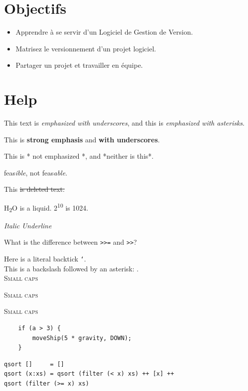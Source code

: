 \hypertarget{objectifs}{%
\section{Objectifs}\label{objectifs}}

\begin{itemize}
\tightlist
\item
  Apprendre à se servir d'un Logiciel de Gestion de Version.
\item
  Matrisez le versionnement d'un projet logiciel.
\item
  Partager un projet et travailler en équipe.
\end{itemize}

\hypertarget{help}{%
\section{Help}\label{help}}

This text is \emph{emphasized with underscores}, and this is
\emph{emphasized with asterisks}.

This is \textbf{strong emphasis} and \textbf{with underscores}.

This is * not emphasized *, and *neither is this*.

feas\emph{ible}, not feas\emph{able}.

This \sout{is deleted text.}

H\textsubscript{2}O is a liquid. 2\textsuperscript{10} is 1024.

\emph{Italic} \ULforem \emph{Underline} \normalem

What is the difference between \texttt{>>=} and
\texttt{>>}?

Here is a literal backtick \texttt{`}.\\

This is a backslash followed by an asterisk: \texttt{\*}.\\

\textsc{Small caps}

\textsc{Small caps}

\textsc{Small caps}

\begin{verbatim}
	if (a > 3) {
		moveShip(5 * gravity, DOWN);
	}
\end{verbatim}

\begin{verbatim}
qsort []     = []
qsort (x:xs) = qsort (filter (< x) xs) ++ [x] ++
qsort (filter (>= x) xs)
\end{verbatim}

